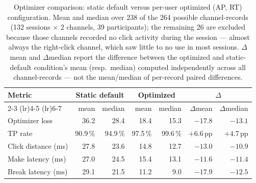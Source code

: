 \begin{table}[t]
\centering
\small
\caption{Optimizer comparison: static default versus per-user optimized (AP, RT)
configuration. Mean and median over 238 of the 264 possible channel-records
(132 sessions $\times$ 2 channels, 39 participants); the remaining 26 are
excluded because those channels recorded no click activity during the
session --- almost always the right-click channel, which saw little to no
use in most sessions.
$\Delta$mean and $\Delta$median report the difference between the optimized and
static-default condition's mean (resp.\ median) computed independently across all
channel-records --- not the mean/median of per-record paired differences.}
\label{tab:optimizer}
\begin{tabular}{lrrrrrr}
\toprule
\textbf{Metric}
  & \multicolumn{2}{c}{\textbf{Static default}}
  & \multicolumn{2}{c}{\textbf{Optimized}}
  & \multicolumn{2}{c}{\textbf{$\Delta$}} \\
\cmidrule(lr){2-3} \cmidrule(lr){4-5} \cmidrule(lr){6-7}
& mean & median & mean & median & $\Delta$mean & $\Delta$median \\
\midrule
Optimizer loss             & 36.2  & 28.4  & 18.4  &  15.3 & $-17.8$ & $-13.1$ \\
TP rate                    & 90.9\,\% & 94.9\,\% & 97.5\,\% &  99.6\,\% & $+6.6$\,pp & $+4.7$\,pp \\
Click distance (ms)        & 27.8  & 23.6  & 14.8  &  12.7 & $-13.0$ & $-10.9$ \\
Make latency (ms)          & 27.0  & 24.5  & 15.4  &  13.1 & $-11.6$ & $-11.4$ \\
Break latency (ms)         & 29.1  & 21.5  & 11.2  &  9.0  & $-17.9$ & $-12.5$ \\
\bottomrule
\end{tabular}
\end{table}

